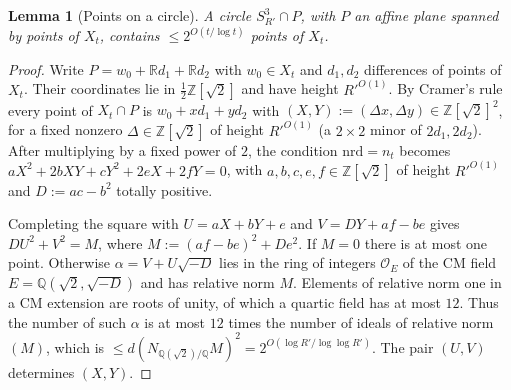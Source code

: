 \documentclass[aps,prx,twocolumn,superscriptaddress,nofootinbib,longbibliography]{revtex4-2}
\theoremstyle{plain}
\newtheorem{lemma}{Lemma}
\theoremstyle{definition}
\theoremstyle{remark}
\newcommand{\Z}{\mathbb{Z}}
\newcommand{\Q}{\mathbb{Q}}
\newcommand{\R}{\mathbb{R}}
\begin{document}
\begin{lemma}[Points on a circle]\label{lem:E5}
A circle $S^3_{R'}\cap P$, with $P$ an affine plane spanned by points of $X_t$, contains $\le2^{O(t/\log t)}$ points of $X_t$.
\end{lemma}
\begin{proof}
Write $P=w_0+\R d_1+\R d_2$ with $w_0\in X_t$ and $d_1,d_2$ differences of points of $X_t$. Their coordinates lie in $\tfrac12\Z[\sqrt2]$ and have height $R'^{O(1)}$. By Cramer's rule every point of $X_t\cap P$ is $w_0+xd_1+yd_2$ with $(X,Y):=(\Delta x,\Delta y)\in\Z[\sqrt2]^2$, for a fixed nonzero $\Delta\in\Z[\sqrt2]$ of height $R'^{O(1)}$ (a $2\times2$ minor of $2d_1,2d_2$). After multiplying by a fixed power of $2$, the condition $\mathrm{nrd}=n_t$ becomes $aX^2+2bXY+cY^2+2eX+2fY=0$, with $a,b,c,e,f\in\Z[\sqrt2]$ of height $R'^{O(1)}$ and $D:=ac-b^2$ totally positive.

Completing the square with $U=aX+bY+e$ and $V=DY+af-be$ gives $DU^2+V^2=M$, where $M:=(af-be)^2+De^2$. If $M=0$ there is at most one point. Otherwise $\alpha=V+U\sqrt{-D}$ lies in the ring of integers $\mathcal O_E$ of the CM field $E=\Q(\sqrt2,\sqrt{-D})$ and has relative norm $M$. Elements of relative norm one in a CM extension are roots of unity, of which a quartic field has at most $12$. Thus the number of such $\alpha$ is at most $12$ times the number of ideals of relative norm $(M)$, which is $\le d(N_{\Q(\sqrt2)/\Q}M)^2=2^{O(\log R'/\log\log R')}$. The pair $(U,V)$ determines $(X,Y)$.
\end{proof}
\end{document}
